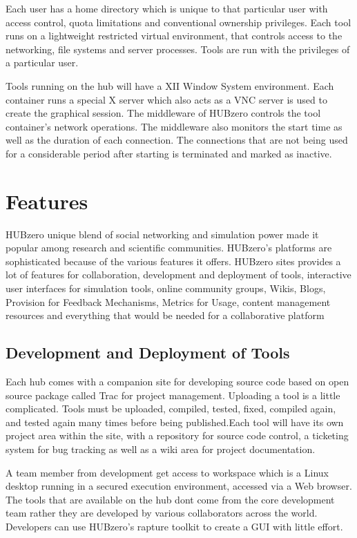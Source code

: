 \documentclass[9pt,twocolumn,twoside]{../../styles/osajnl}
\begin{document}
Each user has a home directory which is unique to that particular user
with access control, quota limitations and conventional ownership
privileges. Each tool runs on a lightweight restricted virtual
environment, that controls access to the networking, file systems and
server processes. Tools are run with the privileges of a particular
user\cite{mclennan2010hubzero}.

Tools running on the hub will have a XII Window System environment.
Each container runs a special X server which also acts as a VNC server
is used to create the graphical session. The middleware of HUBzero
controls the tool container's network operations. The middleware also
monitors the start time as well as the duration of each
connection. The connections that are not being used for a considerable
period after starting is terminated and marked as
inactive\cite{hubzeropurduewebpage}.

\section{Features}
HUBzero unique blend of social networking and simulation power made it
popular among research and scientific communities. HUBzero's platforms
are sophisticated because of the various features it offers. HUBzero
sites provides a lot of features for collaboration, development and
deployment of tools, interactive user interfaces for simulation tools,
online community groups, Wikis, Blogs, Provision for Feedback
Mechanisms, Metrics for Usage, content management resources and
everything that would be needed for a collaborative platform

\subsection{Development and Deployment of Tools}
Each hub comes with a companion site for developing source code based
on open source package called Trac for project management. Uploading a
tool is a little complicated. Tools must be uploaded, compiled,
tested, fixed, compiled again, and tested again many times before
being published.Each tool will have its own project area within the
site, with a repository for source code control, a ticketing system
for bug tracking as well as a wiki area for project documentation.

A team member from development get access to workspace which is a
Linux desktop running in a secured execution environment, accessed via
a Web browser. The tools that are available on the hub dont come from
the core development team rather they are developed by various
collaborators across the world. Developers can use HUBzero's rapture
toolkit to create a GUI with little effort\cite{hubzerofeatures}.
\end{document}
